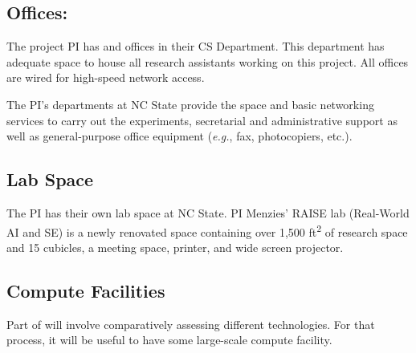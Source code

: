 \documentclass[twoside]{NSF}
\newcommand{\IT}{{\sffamily {\em \mbox{OMNI-2}}}}
\begin{document}
\begin{nsffacilities}
  



 
\subsection*{Offices:}
The project PI has
and offices in their   CS Department. This department
has adequate space to house all research assistants
working on this project. All offices are wired for high-speed network access.

The PI's departments at  NC State provide the space and basic networking services to
carry out the experiments, secretarial and administrative support as well as general-purpose office equipment ({\em e.g.}, fax, photocopiers, etc.).

\subsection*{Lab Space}
The PI has their own lab space at NC State.
PI  Menzies' RAISE lab (Real-World 
AI and SE) is a newly renovated space containing over 1,500 ft\textsuperscript{2} of research space and 
15 cubicles, a meeting space, printer, and wide screen projector. 

\subsection*{Compute Facilities}
Part of {\IT} will involve comparatively assessing different technologies. For that process, it will be useful to have some large-scale compute facility.
 

\end{nsffacilities}
\end{document}
